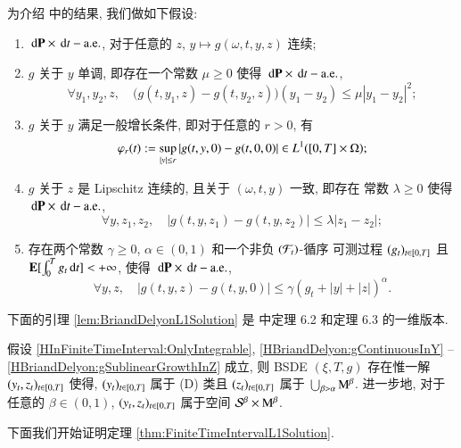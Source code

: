 为介绍 \citet*{BriandDelyonHu2003SPA} 中的结果, 我们做如下假设:
  \begin{enumerate}
    \renewcommand{\theenumi}{(B\arabic{enumi}')}
    \renewcommand{\labelenumi}{\theenumi}
    \setcounter{enumi}{1}

    \item \label{HBriandDelyon:gContinuousInY}
          $\,\mathrm{d}\mathrm{\mathbf{P}}\times\,\mathrm{d} t-\mathrm{a.e.}$, 对于任意的 $z$, $y\mapsto g(\omega,t,y,z)$ 连续;
    \item \label{HBriandDelyon:gMonotonicInY}
          $g$ 关于 $y$ 单调, 即存在一个常数 $\mu\geq 0$ 使得 $\,\mathrm{d}\mathrm{\mathbf{P}}\times\,\mathrm{d} t-\mathrm{a.e.}$,
          $$\forall y_1,y_2,z, \quad \big(g(t,y_1,z)-g(t,y_2,z)\big)(y_1-y_2)\leq \mu|y_1-y_2|^2;$$
    \item \label{HBriandDelyon:gGeneralGrowthInY}
          $g$ 关于 $y$ 满足一般增长条件, 即对于任意的 $r>0$, 有
          $$\varphi_r(t):=\sup_{|y|\leq r}|g(t,y,0)-g(t,0,0)|\in L^1([0,T]\times\Omega);$$
    \item \label{HBriandDelyon:gLipschitzContinuousInZ}
          $g$ 关于 $z$ 是 Lipschitz 连续的, 且关于 $(\omega,t,y)$ 一致, 即存在
          常数 $\lambda\geq 0$ 使得 $\,\mathrm{d}\mathrm{\mathbf{P}}\times\,\mathrm{d} t-\mathrm{a.e.}$,
          $$\forall y,z_1,z_2,\quad |g(t,y,z_1)-g(t,y,z_2)|\leq\lambda|z_1-z_2|;$$
    \item \label{HBriandDelyon:gSublinearGrowthInZ}
          存在两个常数 $\gamma\geq 0$, $\alpha\in(0,1)$ 和一个非负 $(\mathcal{F}_t)$-循序
          可测过程 $(g_t)_{t\in[0,T]}$ 且 $\mathrm{\mathbf{E}}[\int^{T}_{0}g_t\,\mathrm{d} t]<+\infty$, 使得 $\,\mathrm{d}\mathrm{\mathbf{P}}\times\,\mathrm{d} t-\mathrm{a.e.}$,
          $$\forall y,z, \quad |g(t,y,z)-g(t,y,0)|\leq \gamma(g_t+|y|+|z|)^\alpha.$$
  \end{enumerate}

下面的引理 \ref{lem:BriandDelyonL1Solution} 是 \citet*{BriandDelyonHu2003SPA} 中定理
 6.2 和定理 6.3 的一维版本.

\begin{lemma}\label{lem:BriandDelyonL1Solution}
  假设 \ref{HInFiniteTimeInterval:OnlyIntegrable}, \ref{HBriandDelyon:gContinuousInY} -- \ref{HBriandDelyon:gSublinearGrowthInZ}
  成立, 则 BSDE $(\xi,T,g)$ 存在惟一解 $(y_t,z_t)_{t\in[0,T]}$ 使得, $(y_t)_{t\in[0,T]}$
  属于 (D) 类且 $(z_t)_{t\in[0,T]}$ 属于 $\bigcup_{\beta>\alpha}{\rm M}^\beta$. 进一步地,
  对于任意的 $\beta\in(0,1)$, $(y_t,z_t)_{t\in[0,T]}$ 属于空间 $\mathcal{S}^\beta\times{\rm M}^\beta$.
\end{lemma}

下面我们开始证明定理 \ref{thm:FiniteTimeIntervalL1Solution}.

